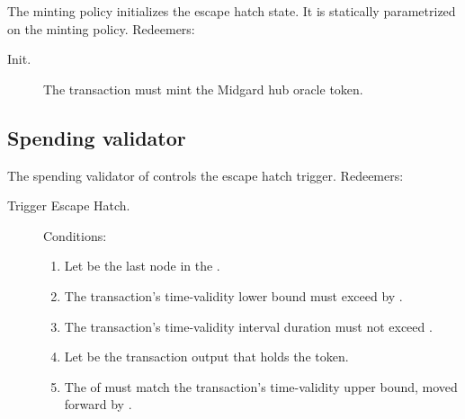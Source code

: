 \documentclass[../midgard.tex]{subfiles}
\begin{document}
The  minting policy initializes the escape hatch state. It is statically parametrized on the  minting policy.
Redeemers:
\begin{description}
  \item[Init.] The transaction must mint the Midgard hub oracle token.
\end{description}

\subsection{Spending validator}%
\label{h:escape-hatch-spending-validator}%

The spending validator of  controls the escape hatch trigger.
Redeemers:
\begin{description}
  \item[Trigger Escape Hatch.] Conditions:
    \begin{enumerate}
      \item Let  be the last node in the .
      \item The transaction's time-validity lower bound must exceed  by .
      \item The transaction's time-validity interval duration must not exceed .
      \item Let  be the transaction output that holds the  token.
      \item The  of  must match the transaction's time-validity upper bound, moved forward by .
    \end{enumerate}
\end{description}
\end{document}
